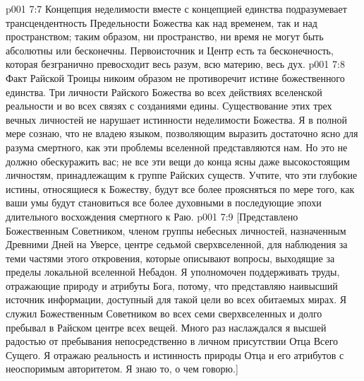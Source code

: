 \vs p001 7:7 Концепция неделимости вместе с концепцией единства подразумевает трансцендентность Предельности Божества как над временем, так и над пространством; таким образом, ни пространство, ни время не могут быть абсолютны или бесконечны. Первоисточник и Центр есть та бесконечность, которая безгранично превосходит весь разум, всю материю, весь дух.
\vs p001 7:8 Факт Райской Троицы никоим образом не противоречит истине божественного единства. Три личности Райского Божества во всех действиях вселенской реальности и во всех связях с созданиями едины. Существование этих трех вечных личностей не нарушает истинности неделимости Божества. Я в полной мере сознаю, что не владею языком, позволяющим выразить достаточно ясно для разума смертного, как эти проблемы вселенной представляются нам. Но это не должно обескуражить вас; не все эти вещи до конца ясны даже высокостоящим личностям, принадлежащим к группе Райских существ. Учтите, что эти глубокие истины, относящиеся к Божеству, будут все более проясняться по мере того, как ваши умы будут становиться все более духовными в последующие эпохи длительного восхождения смертного к Раю.
\vs p001 7:9 [Представлено Божественным Советником, членом группы небесных личностей, назначенным Древними Дней на Уверсе, центре седьмой сверхвселенной, для наблюдения за теми частями этого откровения, которые описывают вопросы, выходящие за пределы локальной вселенной Небадон. Я уполномочен поддерживать труды, отражающие природу и атрибуты Бога, потому, что представляю наивысший источник информации, доступный для такой цели во всех обитаемых мирах. Я служил Божественным Советником во всех семи сверхвселенных и долго пребывал в Райском центре всех вещей. Много раз наслаждался я высшей радостью от пребывания непосредственно в личном присутствии Отца Всего Сущего. Я отражаю реальность и истинность природы Отца и его атрибутов с неоспоримым авторитетом. Я знаю то, о чем говорю.]
